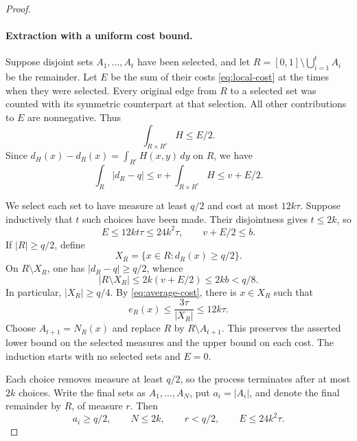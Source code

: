 \documentclass[11pt]{article}
\theoremstyle{remark}
\begin{document}
\begin{proof}
\paragraph{Extraction with a uniform cost bound.}
Suppose disjoint sets $A_1,\ldots,A_t$ have been selected, and let
$R=[0,1]\setminus\bigcup_{i=1}^t A_i$ be the remainder.
Let $E$ be the sum of their costs \eqref{eq:local-cost} at the times
when they were selected. Every original edge from $R$ to a selected
set was counted with its symmetric counterpart at that selection.
All other contributions to $E$ are nonnegative. Thus
\[
 \int_{R\times R^c}H\leq E/2.
\]
Since $d_H(x)-d_R(x)=\int_{R^c}H(x,y)\,dy$ on $R$, we have
\begin{equation}\label{eq:remaining-degree}
 \int_R|d_R-q|
 \leq v+\int_{R\times R^c}H
 \leq v+E/2.
\end{equation}

We select each set to have measure at least $q/2$ and cost at most
$12k\tau$. Suppose inductively that $t$ such choices have been made.
Their disjointness gives $t\leq2k$, so
\begin{equation}\label{eq:total-cost-bound}
 E\leq12kt\tau\leq24k^2\tau,
 \qquad v+E/2\leq b.
\end{equation}
If $|R|\geq q/2$, define
\[
 X_R=\{x\in R:d_R(x)\geq q/2\}.
\]
On $R\setminus X_R$, one has $|d_R-q|\geq q/2$, whence
\[
 |R\setminus X_R|\leq2k(v+E/2)\leq2kb<q/8.
\]
In particular, $|X_R|\geq q/4$.
By \eqref{eq:average-cost}, there is $x\in X_R$ such that
\[
 e_R(x)\leq\frac{3\tau}{|X_R|}\leq12k\tau.
\]
Choose $A_{t+1}=N_R(x)$ and replace $R$ by $R\setminus A_{t+1}$.
This preserves the asserted lower bound on the selected measures and
the upper bound on each cost. The induction starts with no selected
sets and $E=0$.

Each choice removes measure at least $q/2$, so the process terminates
after at most $2k$ choices. Write the final sets as
$A_1,\ldots,A_N$, put $a_i=|A_i|$, and denote the final remainder by
$R$, of measure $r$. Then
\begin{equation}\label{eq:extraction-output}
 a_i\geq q/2,\qquad N\leq2k,\qquad r<q/2,
 \qquad E\leq24k^2\tau.
\end{equation}


\end{proof}
\end{document}
